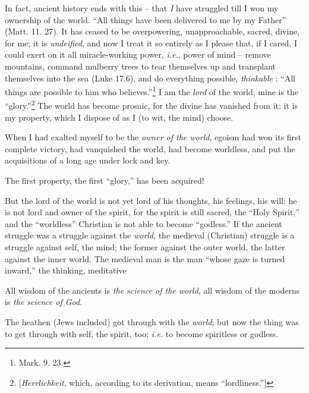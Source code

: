 In fact, ancient history ends with this -- that \textit{I} have struggled till 
I won my ownership of the world. ``All things have been delivered to me by my 
Father'' (Matt. 11. 27). It has ceased to be overpowering, unapproachable, 
sacred, divine, for me; it is \textit{undeified}, and now I treat it so 
entirely as I please that, if I cared, I could exert on it all miracle-working 
power, \textit{i.e.}, power of mind -- remove mountains, command mulberry 
trees to tear themselves up and transplant themselves into the sea (Luke 
17.6), and do everything possible, \textit{thinkable} : ``All things are 
possible to him who believes.''\footnote{Mark. 9. 23.} I am the \textit{lord} 
of the world, mine is the ``glory.''\footnote{[\textit{Herrlichkeit}, which, 
according to its derivation, means ``lordliness.'']} The world has become 
prosaic, for the divine has vanished from it: it is my property, which I 
dispose of as I (to wit, the mind) choose.

When I had exalted myself to be the \textit{owner of the world}, egoism had 
won its first complete victory, had vanquished the world, had become 
worldless, and put the acquisitions of a long age under lock and key.

The first property, the first ``glory,'' has been acquired!

But the lord of the world is not yet lord of his thoughts, his feelings, his 
will: he is not lord and owner of the spirit, for the spirit is still sacred, 
the ``Holy Spirit,'' and the ``worldless'' Christian is not able to become 
``godless.'' If the ancient struggle was a struggle against the 
\textit{world}, the medieval (Christian) struggle is a struggle against self, 
the mind; the former against the outer world, the latter against the inner 
world. The medieval man is the man ``whose gaze is turned inward,'' the 
thinking, meditative

All wisdom of the ancients is \textit{the science of the world}, all wisdom of 
the moderns is \textit{the science of God}.

The heathen (Jews included) got through with the \textit{world}; but now the 
thing was to get through with self, the spirit, too; \textit{i.e.} to become 
spiritless or godless.

